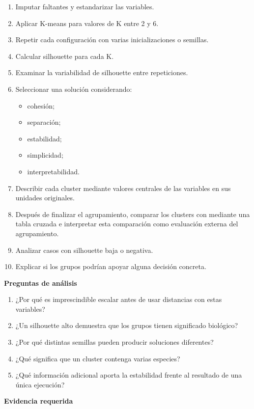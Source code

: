 \documentclass[11pt,a4paper]{article}
\newcommand{\cod}[1]{\texttt{\detokenize{#1}}}
\newcommand{\tercer}[1]{\vspace{0.9em}\noindent\textcolor{UAPTeal}{\textbf{#1}}\par\vspace{0.25em}}
\begin{document}
\begin{enumerate}
  \item Imputar faltantes y estandarizar las variables.
  \item Aplicar K-means para valores de K entre 2 y 6.
  \item Repetir cada configuración con varias inicializaciones o semillas.
  \item Calcular silhouette para cada K.
  \item Examinar la variabilidad de silhouette entre repeticiones.
  \item Seleccionar una solución considerando:
    \begin{itemize}
      \item cohesión;
      \item separación;
      \item estabilidad;
      \item simplicidad;
      \item interpretabilidad.
    \end{itemize}
  \item Describir cada cluster mediante valores centrales de las variables en sus unidades originales.
  \item Después de finalizar el agrupamiento, comparar los clusters con \cod{species} mediante una tabla cruzada e interpretar esta comparación como evaluación externa del agrupamiento.
  \item Analizar casos con silhouette baja o negativa.
  \item Explicar si los grupos podrían apoyar alguna decisión concreta.
\end{enumerate}

\tercer{Preguntas de análisis}

\begin{enumerate}
  \item ¿Por qué es imprescindible escalar antes de usar distancias con estas variables?
  \item ¿Un silhouette alto demuestra que los grupos tienen significado biológico?
  \item ¿Por qué distintas semillas pueden producir soluciones diferentes?
  \item ¿Qué significa que un cluster contenga varias especies?
  \item ¿Qué información adicional aporta la estabilidad frente al resultado de una única ejecución?
\end{enumerate}

\tercer{Evidencia requerida}
\end{document}
